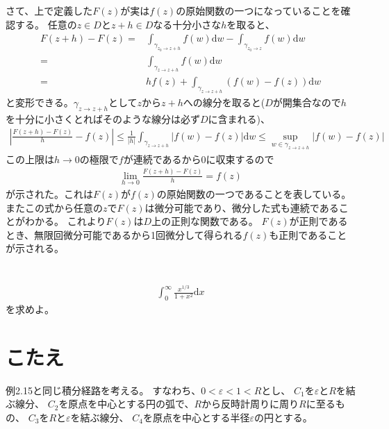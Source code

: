 \documentclass{jsarticle}
\def\diff{\textrm{d}}
\begin{document}
さて、上で定義した$F(z)$が実は$f(z)$の原始関数の一つになっていることを確認する。
任意の$z\in D$と$z+h\in D$なる十分小さな$h$を取ると、
\begin{align*}
    F(z+h)-F(z)=&\int_{\gamma_{z_{0}\to z+h}}f(w)\diff w-\int_{\gamma_{z_{0}\to z}}f(w)\diff w\\
    =&\int_{\gamma_{z\to z+h}}f(w)\diff w\\
    =&hf(z)+\int_{\gamma_{z\to z+h}}(f(w)-f(z))\diff w
\end{align*}
と変形できる。$\gamma_{z\to z+h}$として$z$から$z+h$への線分を取ると($D$が開集合なので$h$を十分に小さくとればそのような線分は必ず$D$に含まれる)、
\begin{align*}
    \left|\frac{F(z+h)-F(z)}{h}-f(z)\right|\leq\frac{1}{|h|}\int_{\gamma_{z\to z+h}}|f(w)-f(z)|\diff w\leq\sup_{w\in\gamma_{z\to z+h}}|f(w)-f(z)|
\end{align*}
この上限は$h\to 0$の極限で$f$が連続であるから$0$に収束するので
\begin{align*}
    \lim_{h\to 0}\frac{F(z+h)-F(z)}{h}=f(z)
\end{align*}
が示された。これは$F(z)$が$f(z)$の原始関数の一つであることを表している。
またこの式から任意の$z$で$F(z)$は微分可能であり、微分した式も連続であることがわかる。
これより$F(z)$は$D$上の正則な関数である。
$F(z)$が正則であるとき、無限回微分可能であるから1回微分して得られる$f(z)$も正則であることが示される。

\section*{}
\begin{align*}
    \int_{0}^{\infty}\frac{x^{1/3}}{1+x^{2}}\diff x
\end{align*}
を求めよ。

\section*{こたえ}
例2.15と同じ積分経路を考える。
すなわち、$0<\varepsilon<1<R$とし、
$C_{1}$を$\varepsilon$と$R$を結ぶ線分、
$C_{2}$を原点を中心とする円の弧で、$R$から反時計周りに周り$R$に至るもの、
$C_{3}$を$R$と$\varepsilon$を結ぶ線分、
$C_{4}$を原点を中心とする半径$\varepsilon$の円とする。
\end{document}
